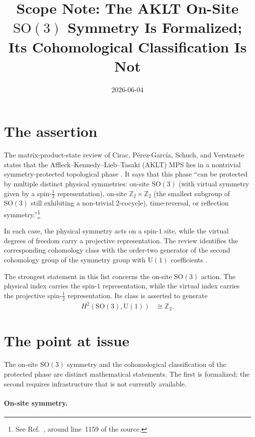 \documentclass[11pt]{article}
\title{Scope Note: The AKLT On-Site $\mathrm{SO}(3)$ Symmetry Is Formalized;
Its Cohomological Classification Is Not}
\author{}
\date{2026-06-04}
\begin{document}
\maketitle
{}

\section{The assertion}

The matrix-product-state review of Cirac, P\'erez-Garc\'ia, Schuch, and
Verstraete states that the Affleck--Kennedy--Lieb--Tasaki (AKLT) MPS lies in a
nontrivial symmetry-protected topological phase
\cite{Cirac2021Matrix}. It says that this phase ``can be protected by multiple
distinct physical symmetries: on-site $\mathrm{SO}(3)$ (with virtual symmetry
given by a spin-$\tfrac{1}{2}$ representation), on-site
$\mathbb{Z}_2\times\mathbb{Z}_2$ (the smallest subgroup of $\mathrm{SO}(3)$
still exhibiting a non-trivial 2-cocycle), time-reversal, or reflection
symmetry.''\footnote{See Ref.~\cite{Cirac2021Matrix}, around line~1159 of the
source.}

In each case, the physical symmetry acts on a spin-$1$ site, while the virtual
degrees of freedom carry a projective representation. The review identifies
the corresponding cohomology class with the order-two generator of the second
cohomology group of the symmetry group with $\mathrm{U}(1)$ coefficients
\cite{Cirac2021Matrix}.

The strongest statement in this list concerns the on-site $\mathrm{SO}(3)$
action. The physical index carries the spin-$1$ representation, while the
virtual index carries the projective spin-$\tfrac{1}{2}$ representation. Its
class is asserted to generate
\begin{align}
    H^2\!\left(\mathrm{SO}(3),\mathrm{U}(1)\right)
        &\cong \mathbb{Z}_2.
    \label{eq:rmp_aklt_continuous_rotation_gap_so3_cohomology}
\end{align}

\section{The point at issue}

The on-site $\mathrm{SO}(3)$ symmetry and the cohomological classification of
the protected phase are distinct mathematical statements. The first is
formalized; the second requires infrastructure that is not currently
available.

\paragraph{On-site symmetry.}
\end{document}
